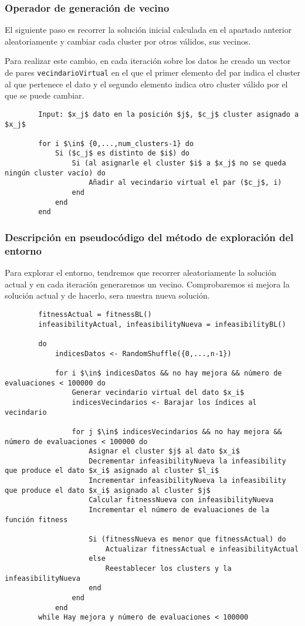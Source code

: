 	\subsubsection{Operador de generación de vecino}
		El siguiente paso es recorrer la solución inicial calculada en el apartado anterior aleatoriamente
		y cambiar cada cluster por otros válidos, sus vecinos.

		Para realizar este cambio, en cada iteración sobre los datos he creado un vector de pares \lstinline!vecindarioVirtual! en el que el primer 
		elemento del par indica el cluster al que pertenece el dato y el segundo elemento indica otro cluster válido por el que se puede cambiar.

		\footnotesize
		\begin{lstlisting}
		Input: $x_j$ dato en la posición $j$, $c_j$ cluster asignado a $x_j$

		for i $\in$ {0,...,num_clusters-1} do 
			Si ($c_j$ es distinto de $i$) do
				Si (al asignarle el cluster $i$ a $x_j$ no se queda ningún cluster vacío) do 
					Añadir al vecindario virtual el par ($c_j$, i)
				end
			end 
		end
		\end{lstlisting}
		\normalsize

	\subsubsection{Descripción en pseudocódigo del método de exploración del entorno}
		Para explorar el entorno, tendremos que recorrer aleatoriamente la solución actual y 
		en cada iteración generaremos un vecino. Comprobaremos si mejora la solución actual y 
		de hacerlo, sera nuestra nueva solución.
		
		\footnotesize
		\begin{lstlisting}
		fitnessActual = fitnessBL()
		infeasibilityActual, infeasibilityNueva = infeasibilityBL()

		do
			indicesDatos <- RandomShuffle({0,...,n-1})

			for i $\in$ indicesDatos && no hay mejora && número de evaluaciones < 100000 do
				Generar vecindario virtual del dato $x_i$
				indicesVecindarios <- Barajar los índices al vecindario

				for j $\in$ indicesVecindarios && no hay mejora && número de evaluaciones < 100000 do 
					Asignar el cluster $j$ al dato $x_i$
					Decrementar infeasibilityNueva la infeasibility que produce el dato $x_i$ asignado al cluster $l_i$
					Incrementar infeasibilityNueva la infeasibility que produce el dato $x_i$ asignado al cluster $j$
					Calcular fitnessNueva con infeasibilityNueva
					Incrementar el número de evaluaciones de la función fitness 

					Si (fitnessNueva es menor que fitnessActual) do 
						Actualizar fitnessActual e infeasibilityActual
					else 
						Reestablecer los clusters y la infeasibilityNueva
					end
				end
			end
		while Hay mejora y número de evaluaciones < 100000
			
	\end{lstlisting}
	\normalsize
		

